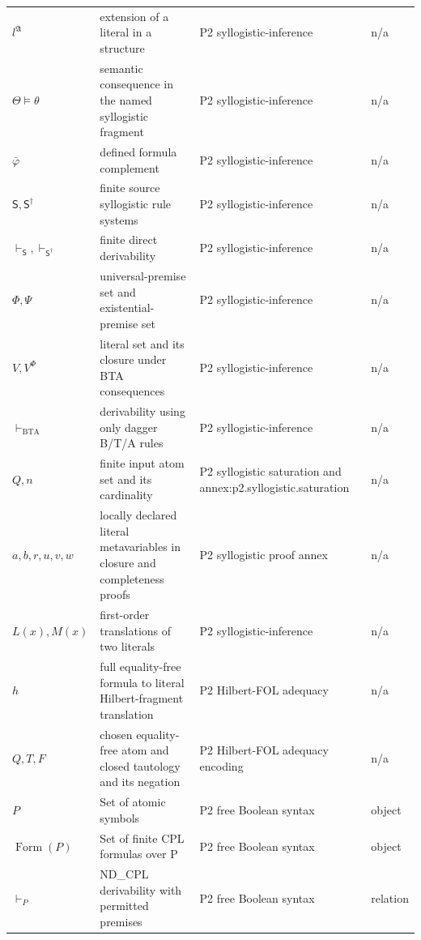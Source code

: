 \begin{longtable}{@{}p{}p{}p{}p{}@{}}
\(l^{\mathfrak A}\) & extension of a literal in a structure & P2 syllogistic-\allowbreak{}inference & n/a \\
\(\Theta\models\theta\) & semantic consequence in the named syllogistic fragment & P2 syllogistic-\allowbreak{}inference & n/a \\
\(\bar\varphi\) & defined formula complement & P2 syllogistic-\allowbreak{}inference & n/a \\
\(\mathsf S,\allowbreak \mathsf S^\dagger\) & finite source syllogistic rule systems & P2 syllogistic-\allowbreak{}inference & n/a \\
\(\vdash_{\mathsf S},\allowbreak \vdash_{\mathsf S^\dagger}\) & finite direct derivability & P2 syllogistic-\allowbreak{}inference & n/a \\
\(\Phi,\allowbreak \Psi\) & universal-premise set and existential-premise set & P2 syllogistic-\allowbreak{}inference & n/a \\
\(V,\allowbreak V^\Phi\) & literal set and its closure under BTA consequences & P2 syllogistic-\allowbreak{}inference & n/a \\
\(\vdash_{\mathrm{BTA}}\) & derivability using only dagger B/T/A rules & P2 syllogistic-\allowbreak{}inference & n/a \\
\(Q,\allowbreak n\) & finite input atom set and its cardinality & P2 syllogistic saturation and annex:\allowbreak{}p2.\allowbreak{}syllogistic.\allowbreak{}saturation & n/a \\
\(a,\allowbreak b,\allowbreak r,\allowbreak u,\allowbreak v,\allowbreak w\) & locally declared literal metavariables in closure and completeness proofs & P2 syllogistic proof annex & n/a \\
\(L(x),\allowbreak M(x)\) & first-order translations of two literals & P2 syllogistic-\allowbreak{}inference & n/a \\
\(h\) & full equality-free formula to literal Hilbert-fragment translation & P2 Hilbert-\allowbreak{}FOL adequacy & n/a \\
\(Q,\allowbreak T,\allowbreak F\) & chosen equality-free atom and closed tautology and its negation & P2 Hilbert-\allowbreak{}FOL adequacy encoding & n/a \\
\(P\) & Set of atomic symbols & P2 free Boolean syntax & object \\
\(\operatorname{Form}(P)\) & Set of finite CPL formulas over P & P2 free Boolean syntax & object \\
\(\vdash_P\) & ND\_CPL derivability with permitted premises & P2 free Boolean syntax & relation \\

\end{longtable}
